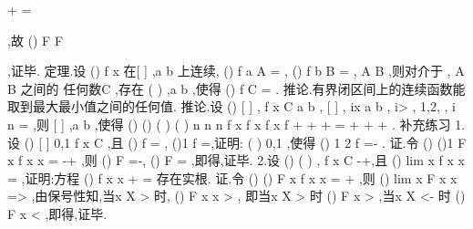 +
=




,故
()
F
F 

\cdots 
\le 




,证毕. 
\textcolor{lyred}{定理}.设
()
f x 在[
]
,a b 上连续,
()
f a
A
=
,
()
f b
B
=
, A
B
\neq 
,则对介于
,
A B 之间的 
任何数C ,存在
(
)
,a b
\psi \in 
,使得
()
f
C
\psi =
. 
\textcolor{lyred}{推论}.有界闭区间上的连续函数能取到最大最小值之间的任何值. 
\textcolor{lyred}{推论}.设
()
[
]
,
f x
C a b
\in 
,
[
]
,
ix
a b
\in 
,
i\lambda >
,
1,2,
,
i
n
=
\Lambda 
,则
[
]
,a b
\psi 
\exists \in 
,使得 
()
()
(
)
(
)
n
n
n
f x
f x
f x
f
\lambda 
\lambda 
\lambda 
\psi 
\lambda 
\lambda 
\lambda 
+
+
+
=
+
+
+
\Lambda 
\Lambda 
. 
\textcolor{lyred}{补充练习 }
1.设
()
[
]
0,1
f x
C
\in 
,且
()
f
=
,
()1
f
=,证明:
(
)
0,1
\psi 
\exists \in 
,使得
()
1 2
f \psi 
\psi 
=-
. 
证.令
()
()1
F x
f x
x
=
-+
,则
()
F
=-,
()
F
=
,即得,证毕. 
2.设
()
(
)
,
f
x
C
\in 
-\infty +\infty ,且
()
lim
x
f x
x
\to \infty 
=
,证明:方程
()
f x
x
+
=
存在实根. 
证.令
()
()
F x
f x
x
=
+
,则
()
lim
x
F x
x
\to \infty 
=>
,由保号性知,当x
X
>
时,
()
F x
x
>
, 
即当x
X
>
时
()
F x >
,当x
X
<-
时
()
F x <
,即得,证毕. 